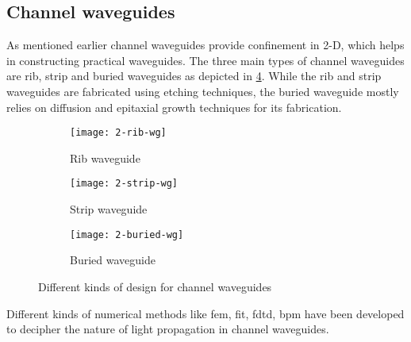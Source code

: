 \documentclass[../report.tex]{subfiles}
\begin{document}
		\subsection{Channel waveguides}			
As mentioned earlier channel waveguides provide confinement in 2-D, which helps in constructing practical waveguides. The three main types of channel waveguides are rib, strip and buried waveguides as depicted in \ref{fig:2_waveguide_types}. While the rib and strip waveguides are fabricated using etching techniques, the buried waveguide mostly relies on diffusion and epitaxial growth techniques for its fabrication.
\begin{figure}[H] %
	\begin{subfigure}[t]{0.3\textwidth}
		\texttt{[image: 2-rib-wg]}
		\caption{Rib waveguide}
		\label{fig:2_rib_wg}
	\end{subfigure}
	\hfill
	\begin{subfigure}[t]{0.3\textwidth}
		\texttt{[image: 2-strip-wg]}
		\caption{Strip waveguide}
		\label{fig:2_strip_wg}
	\end{subfigure}
	\hfill
	\begin{subfigure}[t]{0.3\textwidth}
		\texttt{[image: 2-buried-wg]}
		\caption{Buried waveguide}
		\label{fig:2_buried_wg}
	\end{subfigure}
	\caption{Different kinds of design for channel waveguides}
	\label{fig:2_waveguide_types}
\end{figure}
Different kinds of numerical methods like \gls{fem}, \gls{fit}, \gls{fdtd}, \gls{bpm} have been developed to decipher the nature of light propagation in channel waveguides.
	
\end{document}

